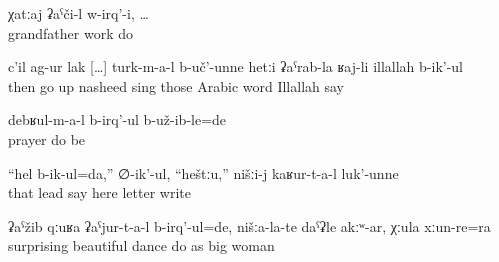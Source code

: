 \begin{exe}
	\ex	\label{ex:Grandfather used to work}
	\gll	χatːaj	ʡaˁči-l	w-irq'-i, \ldots\\
		grandfather	work	do\\
	\glt	{}

	\ex	\label{ex:‎The bandits went upwards, singing anasheed in Arabic}
	\gll	c'il	ag-ur	lak [\ldots]	turk-m-a-l	b-uč'-unne	hetːi	ʡaˁrab-la	ʁaj-li		illallah	b-ik'-ul\\
		then	go	up	{}	nasheed	sing	those	Arabic	word	Illallah		say\\
	\glt	{}

	\ex	\label{ex:They were apparently praying}
	\gll	debʁul-m-a-l	b-irq'-ul	b-už-ib-le=de\\
		prayer	do	be\\
	\glt	{}

	\ex	\label{ex:‎Saying I drive that, here, he was writing letters to us}
	\gll	``hel	b-ik-ul=da,''	∅-ik'-ul,	``heštːu,''		nišːi-j	kaʁur-t-a-l	luk'-unne\\
		that	lead	say	here		letter	write\\
	\glt	{}

	\ex	\label{ex:‎They were dancing surprisingly beautifully, not like our (women), (and they were) also elderly women}
	\gll	ʡaˁžib	qːuʁa	ʡaˁjur-t-a-l	b-irq'-ul=de,	nišːa-la-te	daˁʡle	akːʷ-ar,	χːula	xːun-re=ra\\
		surprising	beautiful	dance	do	 	as		big	woman\\
	\glt	{}
\end{exe}

